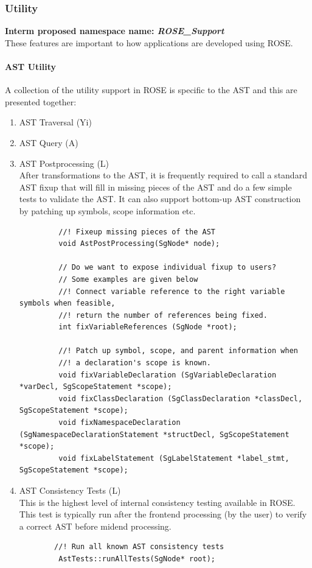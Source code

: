 \subsubsection{Utility}
{\bf Interm proposed namespace name: {\em ROSE\_Support}} \\
   These features are important to how applications are developed using ROSE.

\paragraph{AST Utility}
   A collection of the utility support in ROSE is specific to the AST and this are 
presented together:
\begin{enumerate}
   \item AST Traversal (Yi)
   \item AST Query (A)
   \item AST Postprocessing (L) \\
         After transformations to the AST, it is frequently required to call a
         standard AST fixup that will fill in missing pieces of the AST and do a few simple
         tests to validate the AST.
         It can also support bottom-up AST construction by patching up symbols, scope information etc.
    
         \begin{lstlisting}
         //! Fixeup missing pieces of the AST
         void AstPostProcessing(SgNode* node);
         
         // Do we want to expose individual fixup to users? 
         // Some examples are given below 
         //! Connect variable reference to the right variable symbols when feasible, 
         //! return the number of references being fixed. 
         int fixVariableReferences (SgNode *root);

         //! Patch up symbol, scope, and parent information when 
         //! a declaration's scope is known. 
         void fixVariableDeclaration (SgVariableDeclaration *varDecl, SgScopeStatement *scope);
         void fixClassDeclaration (SgClassDeclaration *classDecl, SgScopeStatement *scope);
         void fixNamespaceDeclaration (SgNamespaceDeclarationStatement *structDecl, SgScopeStatement *scope);
         void fixLabelStatement (SgLabelStatement *label_stmt, SgScopeStatement *scope);

         \end{lstlisting}

   \item AST Consistency Tests (L) \\
         This is the highest level of internal consistency testing available in ROSE.
         This test is typically run after the frontend processing (by the user) to
         verify a correct AST before midend processing.
         \begin{lstlisting}
        //! Run all known AST consistency tests
         AstTests::runAllTests(SgNode* root); 
        

\end{lstlisting}
\end{enumerate}
